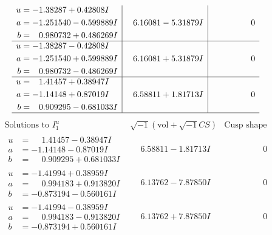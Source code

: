 \documentclass[1p]{elsarticle_modified}
\theoremstyle{definition}
\newcommand{\I}{\sqrt{-1}}
\begin{document}
$$\begin{array}{c|c|c}
\begin{aligned}
u &= -1.38287 + 0.42808 I \\
a &= -1.251540 - 0.599889 I \\
b &= \phantom{-}0.980732 + 0.486269 I\end{aligned}
 & \phantom{-}6.16081 - 5.31879 I & \phantom{-0.000000 } 0 \\ \hline\begin{aligned}
u &= -1.38287 - 0.42808 I \\
a &= -1.251540 + 0.599889 I \\
b &= \phantom{-}0.980732 - 0.486269 I\end{aligned}
 & \phantom{-}6.16081 + 5.31879 I & \phantom{-0.000000 } 0 \\ \hline\begin{aligned}
u &= \phantom{-}1.41457 + 0.38947 I \\
a &= -1.14148 + 0.87019 I \\
b &= \phantom{-}0.909295 - 0.681033 I\end{aligned}
 & \phantom{-}6.58811 + 1.81713 I & \phantom{-0.000000 } 0\\
 \hline 
 \end{array}$$\newpage$$\begin{array}{c|c|c}  
\text{Solutions to }I^u_{1}& \I (\text{vol} + \sqrt{-1}CS) & \text{Cusp shape}\\
 \hline 
\begin{aligned}
u &= \phantom{-}1.41457 - 0.38947 I \\
a &= -1.14148 - 0.87019 I \\
b &= \phantom{-}0.909295 + 0.681033 I\end{aligned}
 & \phantom{-}6.58811 - 1.81713 I & \phantom{-0.000000 } 0 \\ \hline\begin{aligned}
u &= -1.41994 + 0.38959 I \\
a &= \phantom{-}0.994183 + 0.913820 I \\
b &= -0.873194 - 0.560161 I\end{aligned}
 & \phantom{-}6.13762 - 7.87850 I & \phantom{-0.000000 } 0 \\ \hline\begin{aligned}
u &= -1.41994 - 0.38959 I \\
a &= \phantom{-}0.994183 - 0.913820 I \\
b &= -0.873194 + 0.560161 I\end{aligned}
 & \phantom{-}6.13762 + 7.87850 I & \phantom{-0.000000 } 0 \\ \hline\begin{aligned}

\end{aligned}
\end{array}$$
\end{document}
